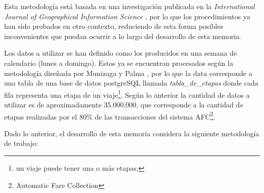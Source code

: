\documentclass[12pt]{article}
\begin{document}

    Esta metodología está basada en una investigación publicada en la \textit{International Journal of Geographical Information Science} \cite{Estructura_urbana}, por lo que los procedimientos ya han sido probados en otro contexto, reduciendo de esta forma posibles inconvenientes que puedan ocurrir a lo largo del desarrollo de esta memoria. 

    Los datos a utilizar se han definido como los producidos en una semana de calendario (lunes a domingo). Estos ya se encuentran procesados según la metodología diseñada por Munizaga y Palma \cite{Procesamiento_datos}, por lo que la data corresponde a una tabla de una base de datos postgreSQL llamada \textit{tabla\_de\_etapas} donde cada fila representa una etapa de un viaje\footnote{un viaje puede tener una o más etapas.}. Según lo anterior la cantidad de datos a utilizar es de aproximadamente 35.000.000, que corresponde a la cantidad de etapas realizadas por el 80\% de las transacciones del sistema AFC\footnote{Automatic Fare Collection}.

    Dado lo anterior, el desarrollo de esta memoria considera la siguiente metodología de trabajo:
\end{document}
